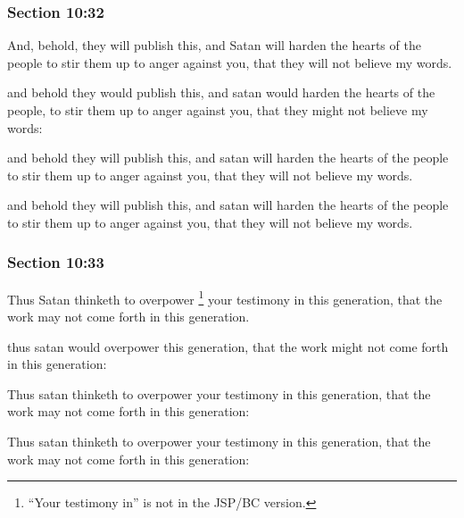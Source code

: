 	\subsubsection{Section 10:32} %
		\label{DC10-32}

		And, behold, they will publish this, and Satan will harden the hearts of the people to stir them up to anger against you, that they will not believe my words.

		\begin{framed}
		\scriptsize
			\begin{compactdesc}
				\item[JSP] and behold they would publish this, and satan would harden the hearts of the people, to stir them up to anger against you, that they might not believe my words:
				\item[RB1] [\textit{missing}] 
				\item[DC 1835] and behold they will publish this, and satan will harden the hearts of the people to stir them up to anger against you, that they will not believe my words.
				\item[DC 1844] and behold they will publish this, and satan will harden the hearts of the people to stir them up to anger against you, that they will not believe my words.
			\end{compactdesc}
		\end{framed}

	\subsubsection{Section 10:33} %
		\label{DC10-33}

		Thus Satan thinketh to overpower
			\footnote{%
				``Your testimony in'' is not in the JSP/BC version.
				}%
		your testimony in this generation, that the work may not come forth in this generation.

		\begin{framed}
		\scriptsize
			\begin{compactdesc}
				\item[JSP] thus satan would overpower this generation, that the work might not come forth in this generation:
				\item[RB1] [\textit{missing}] 
				\item[DC 1835] Thus satan thinketh to overpower your testimony in this generation, that the work may not come forth in this generation:
				\item[DC 1844] Thus satan thinketh to overpower your testimony in this generation, that the work may not come forth in this generation: 
			\end{compactdesc}
		\end{framed}

